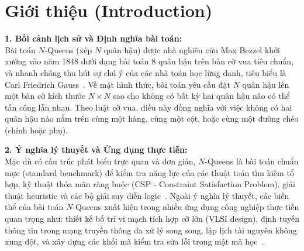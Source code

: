 \documentclass[a4paper,fleqn]{cas-sc}
\begin{document}
\section{Giới thiệu (Introduction)}

\noindent\textbf{1. Bối cảnh lịch sử và Định nghĩa bài toán:}\\
Bài toán $N$-Queens (xếp $N$ quân hậu) được nhà nghiên cứu Max Bezzel khởi xướng vào năm 1848 dưới dạng bài toán 8 quân hậu trên bàn cờ vua tiêu chuẩn, và nhanh chóng thu hút sự chú ý của các nhà toán học lừng danh, tiêu biểu là Carl Friedrich Gauss~\cite{bell2009survey}. Về mặt hình thức, bài toán yêu cầu đặt $N$ quân hậu lên một bàn cờ kích thước $N \times N$ sao cho không có bất kỳ hai quân hậu nào có thể tấn công lẫn nhau. Theo luật cờ vua, điều này đồng nghĩa với việc không có hai quân hậu nào nằm trên cùng một hàng, cùng một cột, hoặc cùng một đường chéo (chính hoặc phụ).

\noindent\textbf{2. Ý nghĩa lý thuyết và Ứng dụng thực tiễn:}\\
Mặc dù có cấu trúc phát biểu trực quan và đơn giản, $N$-Queens là bài toán chuẩn mực (standard benchmark) để kiểm tra năng lực của các thuật toán tìm kiếm tổ hợp, kỹ thuật thỏa mãn ràng buộc (CSP - Constraint Satisfaction Problem), giải thuật heuristic và các bộ giải suy diễn logic~\cite{rossi2006handbook}. Ngoài ý nghĩa lý thuyết, các biến thể của bài toán $N$-Queens xuất hiện trong nhiều ứng dụng công nghiệp thực tiễn quan trọng như: thiết kế bố trí vi mạch tích hợp cỡ lớn (VLSI design), định tuyến thông tin trong mạng truyền thông đa xử lý song song, lập lịch tài nguyên không xung đột, và xây dựng các khối mã kiểm tra sửa lỗi trong mật mã học~\cite{bell2009survey}.
\end{document}
